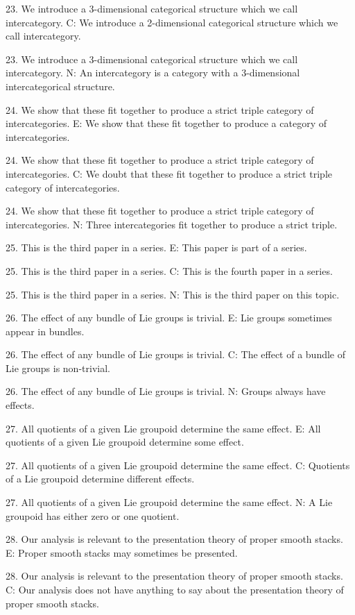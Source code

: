 23.  We introduce a 3-dimensional categorical structure which we call intercategory.
C: We introduce a 2-dimensional categorical structure which we call intercategory.

23.  We introduce a 3-dimensional categorical structure which we call intercategory.
N: An intercategory is a category with a 3-dimensional intercategorical structure.

24. We show that these fit together to produce a strict triple category of intercategories.
E: We show that these fit together to produce a category of intercategories.

24. We show that these fit together to produce a strict triple category of intercategories.
C: We doubt that these fit together to produce a strict triple category of intercategories.

24. We show that these fit together to produce a strict triple category of intercategories.
N: Three intercategories fit together to produce a strict triple.

25. This is the third paper in a series.
E: This paper is part of a series.

25. This is the third paper in a series.
C: This is the fourth paper in a series.

25. This is the third paper in a series.
N: This is the third paper on this topic.

26. The effect of any bundle of Lie groups is trivial.
E: Lie groups sometimes appear in bundles.

26. The effect of any bundle of Lie groups is trivial.
C: The effect of a bundle of Lie groups is non-trivial.

26. The effect of any bundle of Lie groups is trivial.
N: Groups always have effects.

27.  All quotients of a given Lie groupoid determine the same effect.
E: All quotients of a given Lie groupoid determine some effect.

27.  All quotients of a given Lie groupoid determine the same effect.
C: Quotients of a Lie groupoid determine different effects.

27.  All quotients of a given Lie groupoid determine the same effect.
N: A Lie groupoid has either zero or one quotient.

28. Our analysis is relevant to the presentation theory of proper smooth stacks.
E: Proper smooth stacks may sometimes be presented.

28. Our analysis is relevant to the presentation theory of proper smooth stacks.
C: Our analysis does not have anything to say about the presentation theory of proper smooth stacks.

